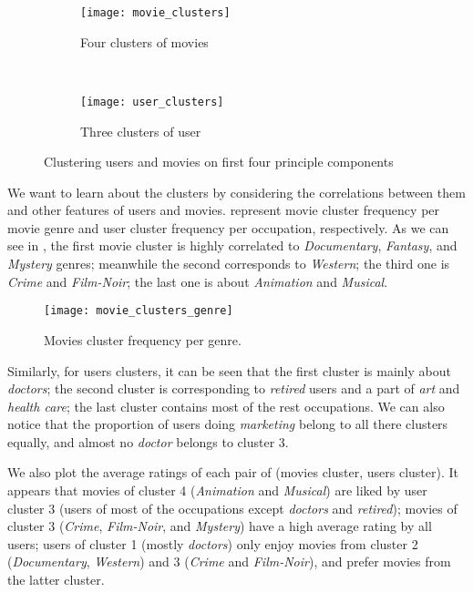 \documentclass[bj, preprint]{imsart}
\begin{document}
\begin{figure*}[t!]
    \centering
    \begin{subfigure}[t]{0.5\textwidth}
	\centering
	\texttt{[image: movie\_clusters]}
	\caption{Four clusters of movies\label{fig:explore.cluster.movies}}
    \end{subfigure}%
    ~ 
    \begin{subfigure}[t]{0.5\textwidth}
	\centering
	\texttt{[image: user\_clusters]}
	\caption{Three clusters of user\label{fig:explore.cluster.users}}
    \end{subfigure}
    \caption{Clustering users and movies on first four principle components}
\end{figure*}

We want to learn about the clusters by considering the correlations between them and other features of users and movies.  represent movie cluster frequency per movie genre and user cluster frequency per occupation, respectively. As we can see in , the first movie cluster is highly correlated to \textit{Documentary}, \textit{Fantasy}, and \textit{Mystery} genres; meanwhile the second corresponds to \textit{Western}; the third one is \textit{Crime} and \textit{Film-Noir}; the last one is about \textit{Animation} and \textit{Musical}. 
\begin{figure}[t!]
	\centering
	\texttt{[image: movie\_clusters\_genre]}
	\caption{Movies cluster frequency per genre.\label{fig:explore.cluster.genre}}
\end{figure}

Similarly, for users clusters, it can be seen that the first cluster is mainly about \textit{doctors}; the second cluster is corresponding to \textit{retired} users and a part of \textit{art} and \textit{health care}; the last cluster contains most of the rest occupations. We can also notice that the proportion of users doing \textit{marketing} belong to all there clusters equally, and almost no \textit{doctor} belongs to cluster 3.

We also plot the average ratings of each pair of (movies cluster, users cluster). It appears that movies of cluster 4 (\textit{Animation} and \textit{Musical}) are liked by user cluster 3 (users of most of the occupations except \textit{doctors} and \textit{retired}); movies of cluster 3 (\textit{Crime}, \textit{Film-Noir}, and \textit{Mystery}) have a high average rating by all users; users of cluster 1 (mostly \textit{doctors}) only enjoy movies from cluster 2 (\textit{Documentary}, \textit{Western}) and 3 (\textit{Crime} and \textit{Film-Noir}), and prefer movies from the latter cluster.
\end{document}
